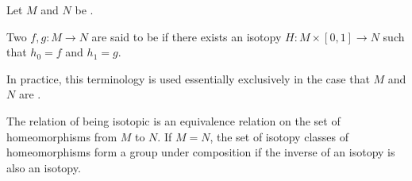 \begin{definition} \label{definition:isotopic_homeomorphisms_between_topological_spaces}
Let $M$ and $N$ be . 

Two  $f, g: M \to N$ are said to be  if there exists an isotopy $H: M \times [0, 1] \to N$ such that $h_0 = f$ and $h_1 = g$.

In practice, this terminology is used essentially exclusively in the case that $M$ and $N$ are .

The relation of being isotopic is an equivalence relation on the set of homeomorphisms from $M$ to $N$. If $M = N$, the set of isotopy classes of homeomorphisms form a group under composition if the inverse of an isotopy is also an isotopy.
\end{definition}